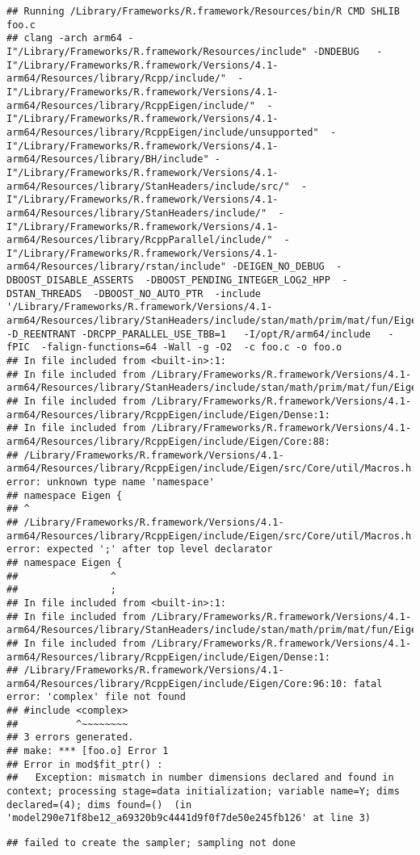 \documentclass[
]{article}
\begin{document}
\begin{verbatim}
## Running /Library/Frameworks/R.framework/Resources/bin/R CMD SHLIB foo.c
## clang -arch arm64 -I"/Library/Frameworks/R.framework/Resources/include" -DNDEBUG   -I"/Library/Frameworks/R.framework/Versions/4.1-arm64/Resources/library/Rcpp/include/"  -I"/Library/Frameworks/R.framework/Versions/4.1-arm64/Resources/library/RcppEigen/include/"  -I"/Library/Frameworks/R.framework/Versions/4.1-arm64/Resources/library/RcppEigen/include/unsupported"  -I"/Library/Frameworks/R.framework/Versions/4.1-arm64/Resources/library/BH/include" -I"/Library/Frameworks/R.framework/Versions/4.1-arm64/Resources/library/StanHeaders/include/src/"  -I"/Library/Frameworks/R.framework/Versions/4.1-arm64/Resources/library/StanHeaders/include/"  -I"/Library/Frameworks/R.framework/Versions/4.1-arm64/Resources/library/RcppParallel/include/"  -I"/Library/Frameworks/R.framework/Versions/4.1-arm64/Resources/library/rstan/include" -DEIGEN_NO_DEBUG  -DBOOST_DISABLE_ASSERTS  -DBOOST_PENDING_INTEGER_LOG2_HPP  -DSTAN_THREADS  -DBOOST_NO_AUTO_PTR  -include '/Library/Frameworks/R.framework/Versions/4.1-arm64/Resources/library/StanHeaders/include/stan/math/prim/mat/fun/Eigen.hpp'  -D_REENTRANT -DRCPP_PARALLEL_USE_TBB=1   -I/opt/R/arm64/include   -fPIC  -falign-functions=64 -Wall -g -O2  -c foo.c -o foo.o
## In file included from <built-in>:1:
## In file included from /Library/Frameworks/R.framework/Versions/4.1-arm64/Resources/library/StanHeaders/include/stan/math/prim/mat/fun/Eigen.hpp:13:
## In file included from /Library/Frameworks/R.framework/Versions/4.1-arm64/Resources/library/RcppEigen/include/Eigen/Dense:1:
## In file included from /Library/Frameworks/R.framework/Versions/4.1-arm64/Resources/library/RcppEigen/include/Eigen/Core:88:
## /Library/Frameworks/R.framework/Versions/4.1-arm64/Resources/library/RcppEigen/include/Eigen/src/Core/util/Macros.h:628:1: error: unknown type name 'namespace'
## namespace Eigen {
## ^
## /Library/Frameworks/R.framework/Versions/4.1-arm64/Resources/library/RcppEigen/include/Eigen/src/Core/util/Macros.h:628:16: error: expected ';' after top level declarator
## namespace Eigen {
##                ^
##                ;
## In file included from <built-in>:1:
## In file included from /Library/Frameworks/R.framework/Versions/4.1-arm64/Resources/library/StanHeaders/include/stan/math/prim/mat/fun/Eigen.hpp:13:
## In file included from /Library/Frameworks/R.framework/Versions/4.1-arm64/Resources/library/RcppEigen/include/Eigen/Dense:1:
## /Library/Frameworks/R.framework/Versions/4.1-arm64/Resources/library/RcppEigen/include/Eigen/Core:96:10: fatal error: 'complex' file not found
## #include <complex>
##          ^~~~~~~~~
## 3 errors generated.
## make: *** [foo.o] Error 1
## Error in mod$fit_ptr() : 
##   Exception: mismatch in number dimensions declared and found in context; processing stage=data initialization; variable name=Y; dims declared=(4); dims found=()  (in 'model290e71f8be12_a69320b9c4441d9f0f7de50e245fb126' at line 3)
\end{verbatim}

\begin{verbatim}
## failed to create the sampler; sampling not done
\end{verbatim}
\end{document}
